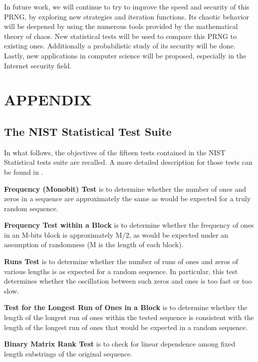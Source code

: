 \documentclass[journal]{IEEEtran}
\begin{document}
In future work, we will continue to try to improve the speed and security of this PRNG, by exploring new strategies and iteration functions. Its chaotic behavior will be deepened by using the numerous tools provided by the mathematical theory of chaos. New statistical tests will be used to compare this PRNG to existing ones. Additionally a probabilistic study of its security will be done. Lastly, new applications in computer science will be proposed, especially in the Internet security field.






\section*{APPENDIX}

\subsection*{The NIST Statistical Test Suite}

In what follows, the objectives of the fifteen tests contained in the NIST Statistical tests suite are recalled. A more detailed description for those tests can be found in \cite{ANDREW2008}.

\textbf{Frequency (Monobit) Test} is to determine whether the number of ones and zeros in a sequence are approximately the same as would be expected for a truly random sequence.


\textbf{Frequency Test within a Block} is to determine whether the frequency of ones in an M-bits block is approximately M/2, as would be expected under an assumption of randomness (M is the length of each block).


\textbf{Runs Test} is to determine whether the number of runs of ones and zeros of various lengths is as expected for a random sequence. In particular, this test determines whether the oscillation between such zeros and ones is too fast or too slow.


\textbf{Test for the Longest Run of Ones in a Block} is to determine whether the length of the longest run of ones within the tested sequence is consistent with the length of the longest run of ones that would be expected in a random sequence.


\textbf{Binary Matrix Rank Test} is to check for linear dependence among fixed length substrings of the original sequence.
\end{document}
